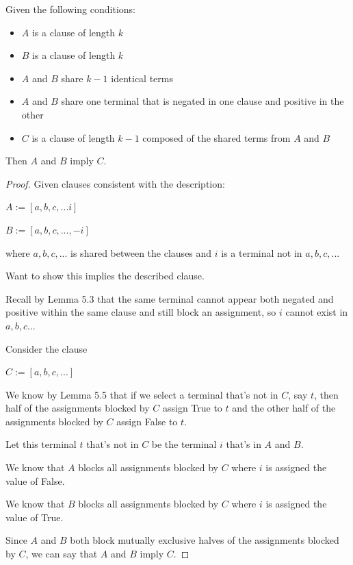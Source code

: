 \documentclass[manuscript]{acmart}
\begin{document}
    \begin{lemma}[Reduction]
        Given the following conditions:
        \begin{itemize}
            \item $A$ is a clause of length $k$
            \item $B$ is a clause of length $k$
            \item $A$ and $B$ share $k-1$ identical terms
            \item $A$ and $B$ share one terminal that is negated in one clause
            and positive in the other
            \item $C$ is a clause of length $k-1$ composed of the shared terms
            from $A$ and $B$
        \end{itemize}
        Then $A$ and $B$ imply $C$.
    \end{lemma}
    \begin{proof}
        Given clauses consistent with the description:

        $A := [a, b, c, ... i]$

        $B := [a, b, c, ..., -i]$

        where $a, b, c, ...$ is shared between the clauses and $i$ is a 
        terminal not in $a, b, c, ...$

        Want to show this implies the described clause.

        Recall by Lemma 5.3 that the same terminal cannot appear both negated and
        positive within the same
        clause and still block an assignment, so $i$ cannot exist in $a, b, c...$

        Consider the clause

        $C := [a, b, c, ...]$

        We know by Lemma 5.5 that if we select a terminal that's not in $C$, say $t$, 
        then half of the assignments blocked by $C$ assign True to $t$ and the other
        half of the assignments blocked by $C$ assign False to $t$.

        Let this terminal $t$ that's not in $C$ be the terminal $i$ that's in $A$ and $B$.

        We know that $A$ blocks all assignments blocked by $C$ where $i$ is assigned
        the value of False.

        We know that $B$ blocks all assignments blocked by $C$ where $i$ is assigned
        the value of True.

        Since $A$ and $B$ both block mutually exclusive halves of the assignments
        blocked by $C$, we can say that $A$ and $B$ imply $C$.
    \end{proof}
\end{document}
